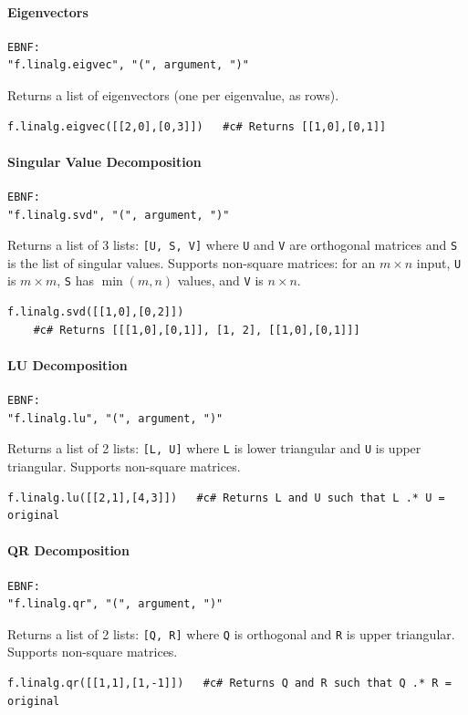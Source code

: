 \paragraph{Eigenvectors}
\begin{verbatim}
EBNF:
"f.linalg.eigvec", "(", argument, ")"
\end{verbatim}
Returns a list of eigenvectors (one per eigenvalue, as rows).
\begin{verbatim}
f.linalg.eigvec([[2,0],[0,3]])   #c# Returns [[1,0],[0,1]]
\end{verbatim}

\paragraph{Singular Value Decomposition}
\begin{verbatim}
EBNF:
"f.linalg.svd", "(", argument, ")"
\end{verbatim}
Returns a list of 3 lists: \texttt{[U, S, V]} where \texttt{U} and \texttt{V} are orthogonal matrices and \texttt{S} is the list of singular values. Supports non-square matrices: for an $m \times n$ input, \texttt{U} is $m \times m$, \texttt{S} has $\min(m, n)$ values, and \texttt{V} is $n \times n$.
\begin{verbatim}
f.linalg.svd([[1,0],[0,2]])
    #c# Returns [[[1,0],[0,1]], [1, 2], [[1,0],[0,1]]]
\end{verbatim}

\paragraph{LU Decomposition}
\begin{verbatim}
EBNF:
"f.linalg.lu", "(", argument, ")"
\end{verbatim}
Returns a list of 2 lists: \texttt{[L, U]} where \texttt{L} is lower triangular and \texttt{U} is upper triangular. Supports non-square matrices.
\begin{verbatim}
f.linalg.lu([[2,1],[4,3]])   #c# Returns L and U such that L .* U = original
\end{verbatim}

\paragraph{QR Decomposition}
\begin{verbatim}
EBNF:
"f.linalg.qr", "(", argument, ")"
\end{verbatim}
Returns a list of 2 lists: \texttt{[Q, R]} where \texttt{Q} is orthogonal and \texttt{R} is upper triangular. Supports non-square matrices.
\begin{verbatim}
f.linalg.qr([[1,1],[1,-1]])   #c# Returns Q and R such that Q .* R = original
\end{verbatim}

